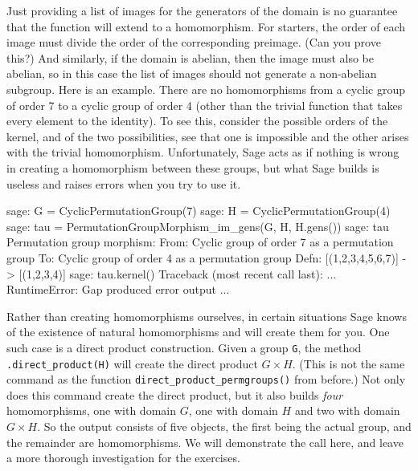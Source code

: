 %
Just providing a list of images for the generators of the domain is no guarantee that the function will extend to a homomorphism.  For starters, the order of each image must divide the order of the corresponding preimage.  (Can you prove this?)  And similarly, if the domain is abelian, then the image must also be abelian, so in this case the list of images should not generate a non-abelian subgroup.  Here is an example.  There are no homomorphisms from a cyclic group of order 7 to a cyclic group of order 4 (other than the trivial function that takes every element to the identity).  To see this, consider the possible orders of the kernel, and of the two possibilities, see that one is impossible and the other arises with the trivial homomorphism.  Unfortunately, Sage acts as if nothing is wrong in creating a homomorphism between these groups, but what Sage builds is useless and raises errors when you try to use it.
%
\begin{sageexample}
sage: G = CyclicPermutationGroup(7)
sage: H = CyclicPermutationGroup(4)
sage: tau = PermutationGroupMorphism_im_gens(G, H, H.gens())
sage: tau
Permutation group morphism:
  From: Cyclic group of order 7 as a permutation group
  To:   Cyclic group of order 4 as a permutation group
  Defn: [(1,2,3,4,5,6,7)] -> [(1,2,3,4)]
sage: tau.kernel()
Traceback (most recent call last):
...
RuntimeError: Gap produced error output
...
\end{sageexample}
%
Rather than creating homomorphisms ourselves, in certain situations Sage knows of the existence of natural homomorphisms and will create them for you.  One such case is a direct product construction.  Given a group \verb?G?, the method \verb?.direct_product(H)? will create the direct product $G\times H$.  (This is not the same command as the function \verb?direct_product_permgroups()? from before.)  Not only does this command create the direct product, but it also builds \emph{four} homomorphisms, one with domain $G$, one with domain $H$ and two with domain $G\times H$.  So the output consists of five objects, the first being the actual group, and the remainder are homomorphisms.  We will demonstrate the call here, and leave a more thorough investigation for the exercises.
%

